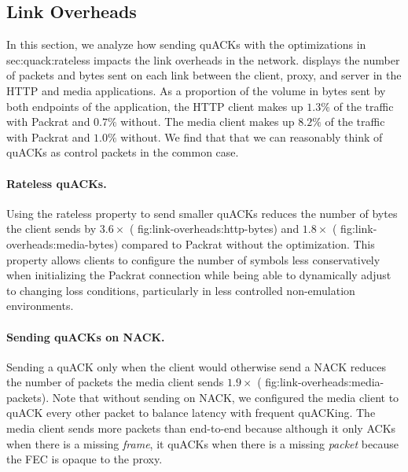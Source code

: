 \subsection{Link Overheads}
\label{sec:packrat:evaluation:link-overheads}



In this section, we analyze how sending quACKs with the optimizations in \Cref
{sec:quack:rateless} impacts the link overheads in the network.
 displays the number of packets and bytes sent on each
link between the client, proxy, and server in the HTTP and media applications.
As a proportion of the volume in bytes sent by both endpoints of the
application, the HTTP client makes up $1.3\%$ of the traffic with Packrat and
$0.7\%$ without. The media client makes up $8.2\%$ of the traffic with Packrat
and $1.0\%$ without. We find that that we can reasonably think of quACKs as
control packets in the common case.

\paragraph{Rateless quACKs.}
Using the rateless property to send smaller quACKs
reduces the number of bytes the client sends by $3.6\!\times$ (\Cref
{fig:link-overheads:http-bytes}) and $1.8\!\times$ (\Cref
{fig:link-overheads:media-bytes}) compared to Packrat without the optimization.
This property allows clients to configure the number of symbols less
conservatively when initializing the Packrat connection while being able to
dynamically adjust to changing loss conditions, particularly in less controlled
non-emulation environments.

\paragraph{Sending quACKs on NACK.}

Sending a quACK only when the client would otherwise send a NACK reduces the
number of packets the media client sends $1.9\!\times$ (\Cref
{fig:link-overheads:media-packets}). Note that without sending on NACK, we
configured the media client to quACK every other packet to balance latency with
frequent quACKing. The media client sends more packets than end-to-end because
although it only ACKs when there is a missing \textit{frame}, it quACKs when
there is a missing \textit{packet} because the FEC is opaque to the proxy.

